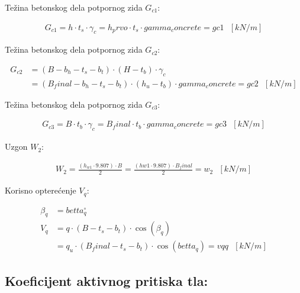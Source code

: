 \documentclass[a4paper, 11pt]{article}
\begin{document}

Te\v{z}ina betonskog dela potpornog zida $G_{c1}$:

\begin{align*}
G_{c1} = h \cdot t_{s} \cdot \gamma_{c} = h_prvo \cdot t_s \cdot gamma_concrete = gc1 \text{ } [kN/m]
\end{align*}

Te\v{z}ina betonskog dela potpornog zida $G_{c2}$:

\begin{align*}
G_{c2} &= (B - b_{h} - t_{s} - b_{t}) \cdot (H-t_{b}) \cdot \gamma_{c} \\
	   &= (B_final - b_h - t_s - b_t) \cdot (h_u - t_b) \cdot gamma_concrete = gc2 \text{ } [kN/m]
\end{align*}

Te\v{z}ina betonskog dela potpornog zida $G_{c3}$:

\begin{align*}
G_{c3} = B \cdot t_{b} \cdot \gamma_c = B_final \cdot t_b \cdot gamma_concrete = gc3 \text{ } [kN/m]
\end{align*}

Uzgon $W_{2}$:

\begin{align*}
W_{2} = \frac{(h_{w1} \cdot 9.807) \cdot B}{2} = \frac{(hw1 \cdot 9.807) \cdot B_final}{2} = w_2 \text{ } [kN/m]
\end{align*}
 
 
Korisno optere\'cenje $V_{q}$:

\begin{align*}
\beta_{q} &= betta_q ^\circ \\
V_{q} &= q \cdot  ( B - t_{s} - b_{t}) \cdot \cos(\beta_{q})  \\
      &= q_u \cdot (B_final - t_s - b_t) \cdot \cos(betta_q) = vqq \text{ } [kN/m]
\end{align*}



\subsection*{Koeficijent aktivnog pritiska tla:}
\end{document}
